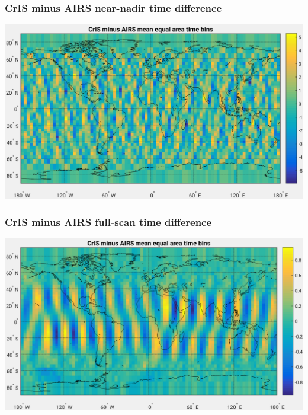 \documentclass[11pt]{beamer}
\begin{document}
\begin{frame}
\frametitle{CrIS minus AIRS near-nadir time difference}
\begin{center}
  \includegraphics[scale=0.5]{figures/cris_minus_airs_time_d1s1w1.pdf}
\end{center}
\end{frame} %
\begin{frame}
\frametitle{CrIS minus AIRS full-scan time difference}
\begin{center}
  \includegraphics[scale=0.5]{figures/cris_minus_airs_time_d1s2w1.pdf}
\end{center}
\end{frame} %
\end{document}
